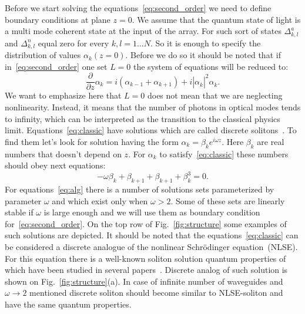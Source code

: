 \documentclass[9pt,twocolumn,twoside]{osajnl}
\begin{document}
\par
Before we start solving the equations~\eqref{eq:second_order}
we need to define boundary conditions at plane $z=0$. 
We assume that the quantum state of light is a multi mode coherent state at the input of the array. For such sort of states $\Delta^{a}_{k,l}$ and $\Delta^{n}_{k,l}$ equal zero for every $k,l = 1\ldots N$. So it is enough to specify the distribution of values $\alpha_k\!\left(z=0\right)$. Before we do so it should be noted that if in~\eqref{eq:second_order} one set $L=0$ the system of equations will be reduced to:
\begin{equation}\label{eq:classic}
	\dfrac{\partial}{\partial z}\alpha_{k}\! =\! i\left(\alpha_{k-1}\! +\! \alpha_{k+1} \right) \!+\! i\left|\alpha^{\phantom{*}}_{k}\!\right|^{2}\alpha^{\phantom{*}}_{k}.
\end{equation}
We want to emphasize here that $ L = 0 $ does not mean that we are neglecting nonlinearity. 
Instead, it means that the number of photons in optical modes tends to infinity, which can be interpreted as the transition to the classical physics limit. 
Equations~\eqref{eq:classic} have solutions which are called discrete solitons~\cite{kevrekidis_discrete_2009}.  
To find them let's look for solution having the form $\alpha_{k} = \beta_k e^{i\omega z}$. Here $\beta_k$ are real numbers that doesn't depend on $z$. 
For $\alpha_{k}$ to satisfy~\eqref{eq:classic} these numbers should obey next equations:
\begin{equation}\label{eq:alg}
	-\omega \beta_k +\beta_{k+1 } + \beta_{k+1} + \beta^{3}_k = 0.
\end{equation}
For equations~\eqref{eq:alg} there is a number of solutions sets parameterized by parameter $\omega$  and which exist only when $\omega > 2$.
Some of these sets are linearly stable if $\omega$ is large enough and we will use them as boundary condition for~\eqref{eq:second_order}.  
On the top row of Fig.~\ref{fig:structure} some examples of such solutions are depicted.  
It should be noted that the equations~\eqref{eq:classic} can be considered a discrete analogue of the nonlinear Schrödinger equation~(NLSE). 
For this equation there is a well-known soliton solution quantum properties of which have been studied in several papers~\cite{corney_quantum_2001,lai_entangled_2009}. 
Discrete analog of such solution is shown on Fig.~\ref{fig:structure}(a). 
In case of infinite number of waveguides and $\omega\rightarrow 2$ mentioned discrete soliton should become similar to NLSE-soliton and have the same quantum properties. 
\end{document}

